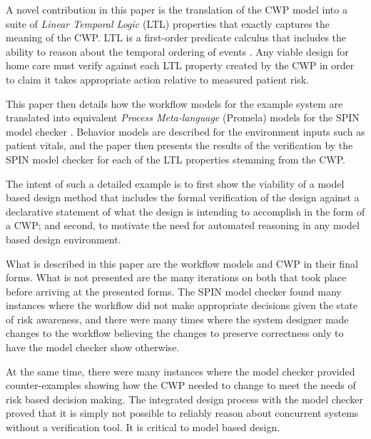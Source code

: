 A novel contribution in this paper is the translation of the CWP model into a suite of \emph{Linear Temporal Logic} (LTL) properties that exactly captures the meaning of the CWP. LTL is a first-order predicate calculus that includes the ability to reason about the temporal ordering of events \cite{10.5555/975331}. Any viable design for home care must verify against each LTL property created by the CWP in order to claim it takes appropriate action relative to measured patient risk.

This paper then details how the workflow models for the example system are translated into equivalent \emph{Process Meta-language} (Promela) models for the SPIN model checker \cite{spin}. Behavior models are described for the environment inputs such as patient vitals, and the paper then presents the results of the verification by the SPIN model checker for each of the LTL properties stemming from the CWP. 

The intent of such a detailed example is to first show the viability of a model based design method that includes the formal verification of the design against a declarative statement of what the design is intending to accomplish in the form of a CWP; and second, to motivate the need for automated reasoning in any model based design environment.  

What is described in this paper are the workflow models and CWP in their final forms. What is not presented are the many iterations on both that took place before arriving at the presented forms. The SPIN model checker found many instances where the workflow did not make appropriate decisions given the state of risk awareness, and there were many times where the system designer made changes to the workflow believing the changes to preserve correctness only to have the model checker show otherwise. 

At the same time, there were many instances where the model checker provided counter-examples showing how the CWP needed to change to meet the needs of risk based decision making. The integrated design process with the model checker proved that it is simply not possible to reliably reason about concurrent systems without a verification tool. It is critical to model based design.